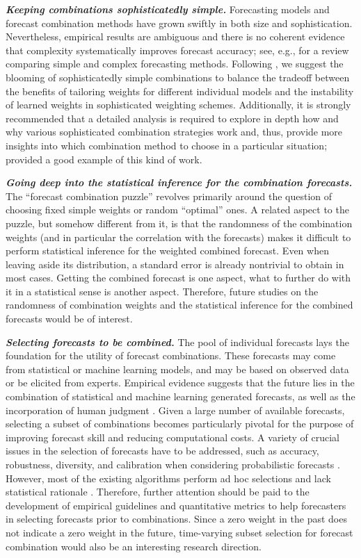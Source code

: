 \documentclass[a4paper,11pt]{article}
\begin{document}
\textbf{\textit{Keeping combinations sophisticatedly simple.}} Forecasting models and forecast combination methods have grown swiftly in both size and sophistication. Nevertheless, empirical results are ambiguous and there is no coherent evidence that complexity systematically improves forecast accuracy; see, e.g., \citet{Green2015-mi} for a review comparing simple and complex forecasting methods. Following \citet{Zellner2001-si}, we suggest the blooming of sophisticatedly simple combinations to balance the tradeoff between the benefits of tailoring weights for different individual models and the instability of learned weights in sophisticated weighting schemes. Additionally, it is strongly recommended that a detailed analysis is required to explore in depth how and why various sophisticated combination strategies work and, thus, provide more insights into which combination method to choose in a particular situation; \citet{Petropoulos2018-fw} provided a good example of this kind of work.

\textbf{\textit{Going deep into the statistical inference for the combination forecasts.}} The ``forecast combination puzzle'' revolves primarily around the question of choosing fixed simple weights or random ``optimal'' ones. A related aspect to the puzzle, but somehow different from it, is that the randomness of the combination weights (and in particular the correlation with the forecasts) makes it difficult to perform statistical inference for the weighted combined forecast. Even when leaving aside its distribution, a standard error is already nontrivial to obtain in most cases. Getting the combined forecast is one aspect, what to further do with it in a statistical sense is another aspect. Therefore, future studies on the randomness of combination weights and the statistical inference for the combined forecasts would be of interest.

\textbf{\textit{Selecting forecasts to be combined.}} The pool of individual forecasts lays the foundation for the utility of forecast combinations. These forecasts may come from statistical or machine learning models, and may be based on observed data or be elicited from experts. Empirical evidence suggests that the future lies in the combination of statistical and machine learning generated forecasts, as well as the incorporation of human judgment \citep{Petropoulos2018-ad,Makridakis2020-hu,Petropoulos2021-ft}. Given a large number of available forecasts, selecting a subset of combinations becomes particularly pivotal for the purpose of improving forecast skill and reducing computational costs. A variety of crucial issues in the selection of forecasts have to be addressed, such as accuracy, robustness, diversity, and calibration when considering probabilistic forecasts \citep{Lichtendahl2020-ut,wang2022another}. However, most of the existing algorithms perform ad hoc selections and lack statistical rationale \citep{Kourentzes2019-na}. Therefore, further attention should be paid to the development of empirical guidelines and quantitative metrics to help forecasters in selecting forecasts prior to combinations. Since a zero weight in the past does not indicate a zero weight in the future, time-varying subset selection for forecast combination would also be an interesting research direction.
\end{document}
